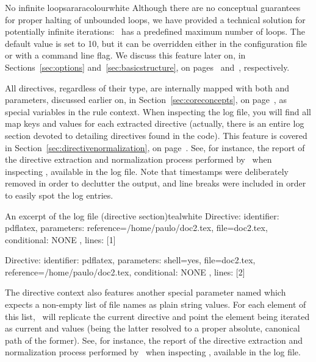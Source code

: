 \begin{messagebox}{No infinite loops}{araracolour}{\icinfo}{white}
Although there are no conceptual guarantees for proper halting of unbounded loops, we have provided a technical solution for potentially infinite iterations: \arara\ has a predefined maximum number of loops. The default value is set to 10, but it can be overridden either in the configuration file or with a command line flag. We discuss this feature later on, in Sections~\ref{sec:options} and~\ref{sec:basicstructure}, on pages~\pageref{sec:options} and~\pageref{sec:basicstructure}, respectively.
\end{messagebox}

All directives, regardless of their type, are internally mapped with both  and  parameters, discussed earlier on, in Section~\ref{sec:coreconcepts}, on page~\pageref{sec:coreconcepts}, as special variables in the rule context. When inspecting the log file, you will find all map keys and values for each extracted directive (actually, there is an entire log section devoted to detailing directives found in the code). This feature is covered in Section~\ref{sec:directivenormalization}, on page~\pageref{sec:directivenormalization}. See, for instance, the report of the directive extraction and normalization process performed by \arara\ when inspecting , available in the log file. Note that timestamps were deliberately removed in order to declutter the output, and line breaks were included in order to easily spot the log entries.


\begin{codebox}{An excerpt of the log file (directive section)}{teal}{\icnote}{white}
Directive: { identifier: pdflatex, parameters:
{reference=/home/paulo/doc2.tex, file=doc2.tex},
conditional: { NONE }, lines: [1] }

Directive: { identifier: pdflatex, parameters:
{shell=yes, file=doc2.tex, reference=/home/paulo/doc2.tex},
conditional: { NONE }, lines: [2] }
\end{codebox}

The directive context also features another special parameter named  which expects a non-empty list of file names as plain string values. For each element of this list, \arara\ will replicate the current directive and point the element being iterated as current  and  values (being the latter resolved to a proper absolute, canonical path of the former). See, for instance, the report of the directive extraction and normalization process performed by \arara\ when inspecting , available in the log file.

